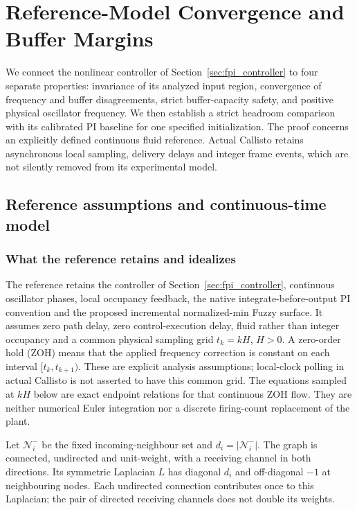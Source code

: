 \section{Reference-Model Convergence and Buffer Margins}
\label{sec:btd_reference}

We connect the nonlinear controller of Section~\ref{sec:fpi_controller}
to four separate properties: invariance of its analyzed input region,
convergence of frequency and buffer disagreements, strict buffer-capacity
safety, and positive physical oscillator frequency. We then establish a
strict headroom comparison with its calibrated PI baseline for one
specified initialization. The proof concerns an explicitly defined
continuous fluid reference. Actual Callisto retains asynchronous local
sampling, delivery delays and integer frame events, which are not
silently removed from its experimental model.

\subsection{Reference assumptions and continuous-time model}
\label{subsec:btd_ref_model}

\subsubsection{What the reference retains and idealizes}
The reference retains the controller of Section~\ref{sec:fpi_controller}, continuous oscillator phases, local occupancy
feedback, the native integrate-before-output PI convention and the proposed
incremental normalized-min Fuzzy surface. It assumes zero path delay,
zero control-execution delay, fluid rather than integer occupancy and a
common physical sampling grid $t_k=kH$, $H>0$. A zero-order hold (ZOH)
means that the applied frequency correction is constant on each interval
$[t_k,t_{k+1})$. These are explicit analysis assumptions; local-clock
polling in actual Callisto is not asserted to have this common grid.
The equations sampled at $kH$ below are exact endpoint relations for that
continuous ZOH flow. They are neither numerical Euler integration nor a
discrete firing-count replacement of the plant.

Let $\mathcal N_i^-$ be the fixed incoming-neighbour set and
$d_i=|\mathcal N_i^-|$. The graph is connected, undirected and unit-weight,
with a receiving channel in both directions. Its symmetric Laplacian
$L$ has diagonal $d_i$ and off-diagonal $-1$ at neighbouring nodes. Each
undirected connection contributes once to this Laplacian; the pair of
directed receiving channels does not double its weights.

